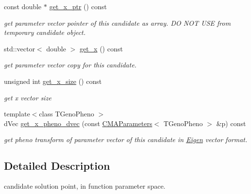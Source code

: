 \begin{DoxyCompactItemize}
const double $\ast$ \hyperlink{classlibcmaes_1_1Candidate_ace56d764d7d88d5f11f96e9ee6cb775d}{get\-\_\-x\-\_\-ptr} () const 
\begin{DoxyCompactList}\small\item\em get parameter vector pointer of this candidate as array. D\-O N\-O\-T U\-S\-E from temporary candidate object. \end{DoxyCompactList}\item 
std\-::vector$<$ double $>$ \hyperlink{classlibcmaes_1_1Candidate_af6374f304455c3245913d03cfac221b7}{get\-\_\-x} () const 
\begin{DoxyCompactList}\small\item\em get parameter vector copy for this candidate. \end{DoxyCompactList}\item 
unsigned int \hyperlink{classlibcmaes_1_1Candidate_acafc0cd2e517e0edea82b3af7dea885f}{get\-\_\-x\-\_\-size} () const 
\begin{DoxyCompactList}\small\item\em get x vector size \end{DoxyCompactList}\item 
{\footnotesize template$<$class T\-Geno\-Pheno $>$ }\\d\-Vec \hyperlink{classlibcmaes_1_1Candidate_a99fac12003c21735f384322743c4dbf1}{get\-\_\-x\-\_\-pheno\-\_\-dvec} (const \hyperlink{classlibcmaes_1_1CMAParameters}{C\-M\-A\-Parameters}$<$ T\-Geno\-Pheno $>$ \&p) const 
\begin{DoxyCompactList}\small\item\em get pheno transform of parameter vector of this candidate in \hyperlink{namespaceEigen}{Eigen} vector format. \end{DoxyCompactList}\end{DoxyCompactItemize}


\subsection{Detailed Description}
candidate solution point, in function parameter space. 

